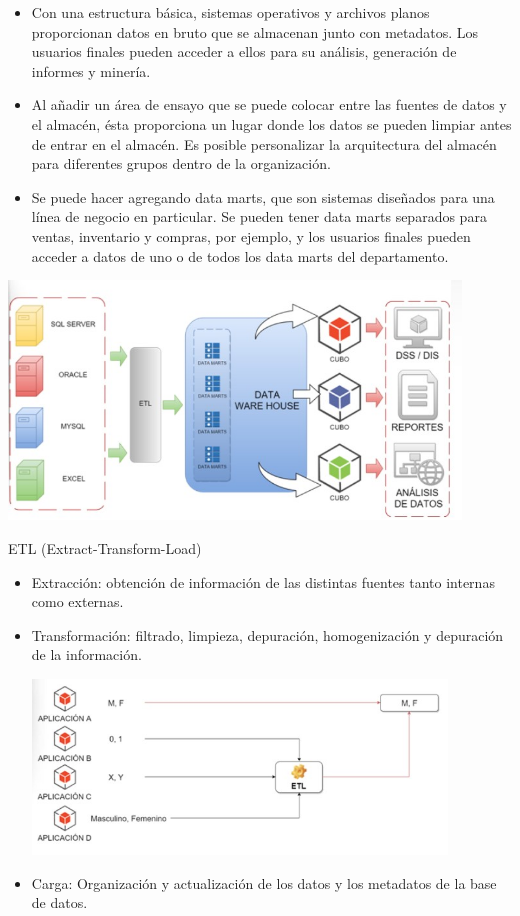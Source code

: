 \documentclass[preprint,12pt]{elsarticle}
\begin{document}
\begin{itemize}
	\item Con una estructura básica, sistemas operativos y archivos planos proporcionan datos en bruto que se almacenan junto con metadatos. Los usuarios finales pueden acceder a ellos para su análisis, generación de informes y minería.
	\item Al añadir un área de ensayo que se puede colocar entre las fuentes de datos y el almacén, ésta proporciona un lugar donde los datos se pueden limpiar antes de entrar en el almacén. Es posible personalizar la arquitectura del almacén para diferentes grupos dentro de la organización.
	\item Se puede hacer agregando data marts, que son sistemas diseñados para una línea de negocio en particular. Se pueden tener data marts separados para ventas, inventario y compras, por ejemplo, y los usuarios finales pueden acceder a datos de uno o de todos los data marts del departamento.
\end{itemize}

\begin{center}
	\includegraphics[width=12cm]{./Imagenes/imagen1} 
\end{center}


\pagebreak


ETL (Extract-Transform-Load)\\
\begin{itemize}
	\item Extracción: obtención de información de las distintas fuentes tanto internas como externas.
	\item Transformación: filtrado, limpieza, depuración, homogenización y depuración de la información.

\begin{center}
	\includegraphics[width=11cm]{./Imagenes/imagen2} 
\end{center}

	\item Carga: Organización y actualización de los datos y los metadatos de la base de datos.
\end{itemize}
\end{document}
